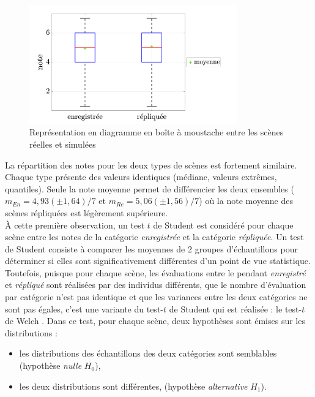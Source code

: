 \begin{figure}[h]
\centering
\includegraphics[width = 0.8\textwidth]{./figures/test_perceptif/testPerceptif_boxplotType.pdf}
\caption{Représentation en diagramme en boîte à moustache entre les scènes réelles et simulées}\label{fig:ANOVA_scene}
\end{figure}

La répartition des notes pour les deux types de scènes est fortement similaire. Chaque type présente des valeurs identiques (médiane, valeurs extrêmes, quantiles). Seule la note moyenne permet de différencier les deux ensembles ($m_{En} = 4,93 (\pm 1,64) / 7$ et $m_{Re} = 5,06 (\pm 1,56) / 7$) où la note moyenne des scènes répliquées est légèrement supérieure.\\

À cette première observation, un test $t$ de Student est considéré pour chaque scène entre les notes de la catégorie \textit{enregistrée} et la catégorie \textit{répliquée}. Un test de Student consiste à comparer les moyennes de 2 groupes d'échantillons pour déterminer si elles sont significativement différentes d'un point de vue statistique. Toutefois, puisque pour chaque scène, les évaluations entre le pendant \textit{enregistré} et \textit{répliqué} sont réalisées par des individus différents, que le nombre d'évaluation par catégorie n'est pas identique et que les variances entre les deux catégories ne sont pas égales, c'est une variante du test-$t$ de Student qui est réalisée : le test-$t$ de Welch \cite{ruxton2006unequal}. Dans ce test, pour chaque scène, deux hypothèses sont émises sur les distributions :

\begin{itemize}
\item les distributions des échantillons des deux catégories sont semblables (hypothèse \textit{nulle} $H_0$),
\item les deux distributions sont différentes, (hypothèse \textit{alternative} $H_1$).\\
\end{itemize}

